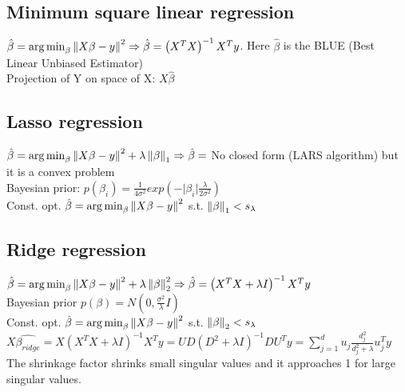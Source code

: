 \subsection*{Minimum square linear regression}
\(\hat{\beta} = \operatorname*{arg\,min}_{\beta}{\left\lVert X\beta - y\right\rVert^2} \Rightarrow \hat{\beta} = \left(X^TX \right)^{-1}X^T y\). Here \(\hat{\beta}\) is the BLUE (Best Linear Unbiased Estimator) \\
Projection of Y on space of X: $X \hat{\beta}$
\subsection*{Lasso regression}
\(\hat{\beta} = \operatorname*{arg\,min}_{\beta}{\left\lVert X\beta - y\right\rVert}^2 + \lambda\left\lVert\beta\right\rVert_{1}\Rightarrow \hat{\beta} =\)  No closed form (LARS algorithm) but it is a convex problem\\
Bayesian prior: \(p(\beta_i) = \frac{1}{4\sigma^2}exp\left(-\vert\beta_i\vert\frac{\lambda}{2\sigma^2}\right)\)\\
{Const. opt. \scriptsize  $\hat{\beta} = \operatorname*{arg\,min}_{\beta}{\left\lVert X\beta - y\right\rVert}^2$ s.t. $\left\lVert\beta\right\rVert_1<s_\lambda$}
\subsection*{Ridge regression}
\(\hat{\beta} = \operatorname*{arg\,min}_{\beta}{\left\lVert X\beta - y\right\rVert^2} + \lambda\left\lVert\beta\right\rVert_{2}^{2}\Rightarrow \hat{\beta}  =  \left(X^TX + \lambda I\right)^{-1}X^T y\) \\
Bayesian prior \(p(\beta) = N(0, \frac{\sigma^2}{\lambda}I)\)\\ 

{Const. opt. \scriptsize  $\hat{\beta} = \operatorname*{arg\,min}_{\beta}{\left\lVert X\beta - y\right\rVert^2}$ s.t. $\left\lVert\beta\right\rVert_2<s_\lambda$}\\ 

$X\hat{\beta_{ridge}} = X(X^TX + \lambda I)^{-1}X^Ty = UD(D^2 + \lambda I)^{-1}DU^Ty = \sum\limits_{j=1}^{d} u_j \frac{d_j^2}{d_j^2 + \lambda}u_j^Ty$ \\
The shrinkage factor shrinks small singular values and it approaches 1 for large singular values.
